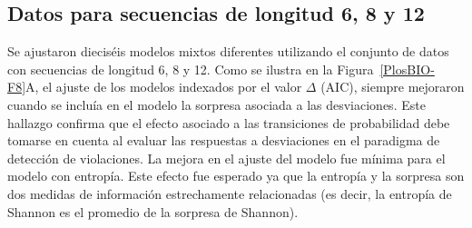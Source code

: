 \subsection{Datos para secuencias de longitud 6, 8 y 12}


Se ajustaron dieciséis modelos mixtos diferentes utilizando el conjunto de datos con secuencias de longitud 6, 8 y 12. Como se ilustra en la Figura~\ref{PlosBIO-F8}A, el ajuste de los modelos indexados por el valor $\Delta$ (AIC), siempre mejoraron cuando se incluía en el modelo la sorpresa asociada a las desviaciones. Este hallazgo confirma que el efecto asociado a las transiciones de probabilidad debe tomarse en cuenta al evaluar las respuestas a desviaciones en el paradigma de detección de violaciones. La mejora en el ajuste del modelo fue mínima para el modelo con entropía. Este efecto fue esperado ya que la entropía y la sorpresa son dos medidas de información estrechamente relacionadas (es decir, la entropía de Shannon es el promedio de la sorpresa de Shannon).



